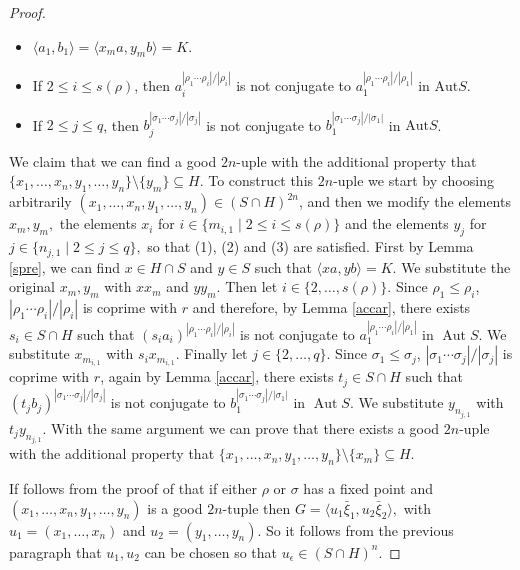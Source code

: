 \documentclass{amsart}
\DeclareMathOperator{\aut}{Aut}
\newcommand{\Aut}{\mathrm{Aut}}
\numberwithin{equation}{section}
\begin{document}
\begin{proof}
	\begin{itemize}
		\item[(1)] $\langle a_1, b_1 \rangle=
		\langle x_ma, y_mb \rangle=K$.
		\item[(2)] If $2 \leq i \leq s(\rho)$, then $a_i^{|\rho_1 \cdots \rho_i|/|\rho_i|}$ is not conjugate to
		$a_1^{|\rho_1 \cdots \rho_i|/|\rho_1|}$  in $\Aut S.$
		\item[(3)] If $2 \le j \le q$, then $b_j^{|\sigma_1 \cdots \sigma_j|/|\sigma_j|}$ is not conjugate to
		$b_1^{|\sigma_1 \cdots \sigma_j|/|\sigma_1|}$ in $\Aut S$.
	\end{itemize}

We claim that we can find a good $2n$-uple with the additional property that $\{x_1,\dots,x_n,y_1,\dots,y_n\}\setminus \{y_m\}\subseteq H.$ To construct this $2n$-uple we start by choosing arbitrarily $(x_1,\ldots,x_n,y_1,\ldots,y_n)\in (S\cap H)^{2n}$, and then we modify the elements $x_m, y_m,$ the elements
$x_i$ for 	$i \in \{m_{i,1}\mid 2 \leq i \leq s(\rho)\}$ and the elements $y_j$ for
$j \in \{n_{j,1}\mid 2 \leq j \leq q\},$ so that  (1), (2) and (3) are satisfied.
First by  Lemma \ref{spre}, we can find $x \in H\cap S$ and $y \in S$   such that $\langle x a, yb \rangle=K$. We substitute
the original $x_m, y_m$ with $xx_m$ and $yy_m.$
Then let  $i\in \{2,\dots,s(\rho)\}.$
Since $\rho_1 \le \rho_i$, 
 $|\rho_1 \cdots \rho_i|/|\rho_i|$ is coprime with $r$ and therefore,  
	by Lemma \ref{accar}, there exists 
	$s_i \in S\cap H$ such that $
	(s_ia_i)^{|\rho_1 \cdots \rho_i|/|\rho_i|}$ is not conjugate to 
	$a_1^{|\rho_1 \cdots \rho_i|/|\rho_1|}$ in $\aut S$.
	We substitute  $x_{m_{i,1}}$  with $s_i x_{m_{i,1}}.$
Finally let  $j\in \{2,\dots,q\}.$
Since $\sigma_1 \le \sigma_j$, 
$|\sigma_1 \cdots \sigma_j|/|\sigma_j|$ is coprime with $r$, 
again by Lemma \ref{accar}, there exists 
$t_j \in S\cap H$ such that $
(t_jb_j)^{|\sigma_1 \cdots \sigma_j|/|\sigma_j|}$ is not conjugate to 
$b_1^{|\sigma_1 \cdots \sigma_j|/|\sigma_1|}$ in $\aut S$.
We substitute  
$y_{n_{j,1}}$ with $t_jy_{n_{j,1}}.$
With the same argument we can prove that there exists a good $2n$-uple with the additional property that $\{x_1,\dots,x_n,y_1,\dots,y_n\}\setminus \{x_m\}\subseteq H.$	
	
If follows from the proof of \cite [Theorem 1.1]{uni} that if either $\rho$ or $\sigma$ has a fixed point and
$(x_1,\dots,x_n,y_1,\dots,y_n)$ is a good $2n$-tuple then $G=\langle u_1\bar \xi_1,
u_2\bar \xi_2\rangle,$ with $u_1=(x_1,\dots,x_n)$ and $u_2=(y_1,\dots,y_n).$ So it follows from the previous paragraph that $u_1,u_2$ can be chosen so that $u_\epsilon \in (S\cap H)^n.$
	

\end{proof}
\end{document}
